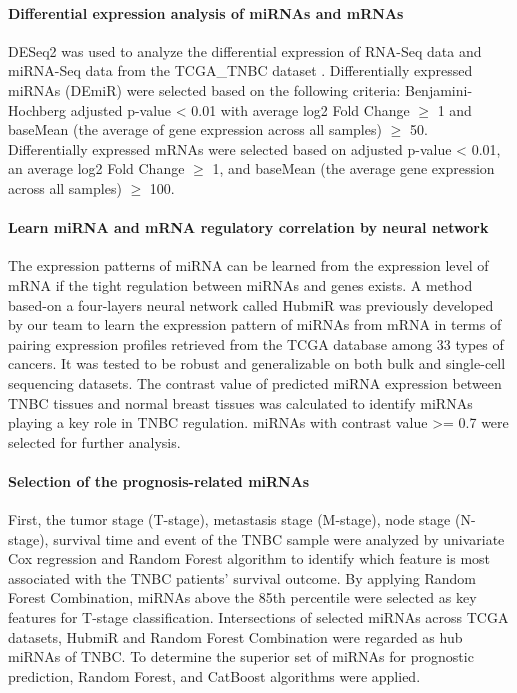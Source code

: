 \paragraph{Differential expression analysis of miRNAs and mRNAs}

DESeq2 was used to analyze the differential expression of RNA-Seq data and miRNA-Seq data from the TCGA\_TNBC dataset \cite{abudour2024role}. Differentially expressed miRNAs (DEmiR) were selected based on the following criteria: Benjamini-Hochberg adjusted p-value \textless{} 0.01 with average \textbar log2 Fold Change\textbar{} $\geq$ 1 and baseMean (the average of gene expression across all samples) $\geq$ 50. Differentially expressed mRNAs were selected based on adjusted p-value \textless{} 0.01, an average \textbar log2 Fold Change\textbar{} $\geq$ 1, and baseMean (the average gene expression across all samples) $\geq$ 100.

\paragraph{Learn miRNA and mRNA regulatory correlation by neural network}

The expression patterns of miRNA can be learned from the expression level of mRNA if the tight regulation between miRNAs and genes exists. A method based-on a four-layers neural network called HubmiR \cite{abudour2024role} was previously developed by our team to learn the expression pattern of miRNAs from mRNA in terms of pairing expression profiles retrieved from the TCGA database \cite{abudour2024role} among 33 types of cancers. It was tested to be robust and generalizable on both bulk and single-cell sequencing datasets. The contrast value of predicted miRNA expression between TNBC tissues and normal breast tissues was calculated to identify miRNAs playing a key role in TNBC regulation. miRNAs with contrast value \textgreater= 0.7 were selected for further analysis.

\paragraph{Selection of the prognosis-related miRNAs}

First, the tumor stage (T-stage), metastasis stage (M-stage), node stage (N-stage), survival time and event of the TNBC sample were analyzed by univariate Cox regression and Random Forest algorithm to identify which feature is most associated with the TNBC patients' survival outcome. By applying Random Forest Combination, miRNAs above the 85th percentile were selected as key features for T-stage classification. Intersections of selected miRNAs across TCGA datasets, HubmiR and Random Forest Combination were regarded as hub miRNAs of TNBC. To determine the superior set of miRNAs for prognostic prediction, Random Forest, and CatBoost algorithms were applied.

